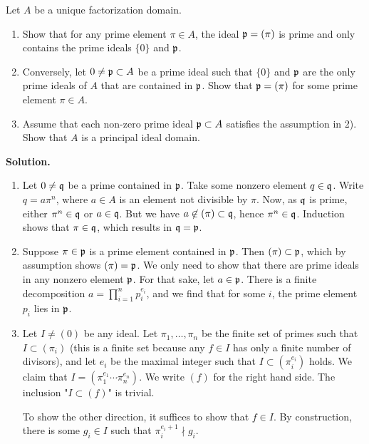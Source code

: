 \documentclass[a4paper,11pt]{article}
\begin{document}
Let $A$ be a unique factorization domain. 
\begin{enumerate}
    \item Show that for any prime element $\pi \in A$, the ideal $\mathfrak{p} = (\pi)$ is 
        prime and only contains the prime ideals $\{0\}$ and $\mathfrak{p}$.
    \item Conversely, let $0 \neq \mathfrak{p} \subset A$ be a prime ideal such that $\{0\}$
        and $\mathfrak{p}$ are the only prime ideals of $A$ that are contained in $\mathfrak{p}$. 
        Show that $\mathfrak{p} = (\pi)$ for some prime element $\pi \in A$. 
    \item Assume that each non-zero prime ideal $\mathfrak{p} \subset A$ satisfies the
        assumption in 2). Show that $A$ is a principal ideal domain. 
\end{enumerate}

\textbf{Solution.}
\begin{enumerate}
    \item Let $0 \neq \mathfrak{q}$ be a prime contained in $\mathfrak{p}$. Take some nonzero
        element $q \in \mathfrak{q}$. Write $q = a \pi^n$, where $a \in A$ is an element
        not divisible by $\pi$. Now, as $\mathfrak{q}$ is prime, either $\pi^n \in \mathfrak{q}$ or 
        $a \in \mathfrak{q}$. But we have $a \not \in (\pi) \subset \mathfrak{q}$, hence
        $\pi^n \in \mathfrak{q}$. Induction shows that $\pi \in \mathfrak{q}$, which results in
        $\mathfrak{q} = \mathfrak{p}$. 

    \item Suppose $\pi \in \mathfrak{p}$ is a prime element contained in $\mathfrak{p}$. Then
        $(\pi) \subset \mathfrak{p}$, which by assumption shows $(\pi) = \mathfrak{p}$. 
        We only need to show that there are prime ideals in any
        nonzero element $\mathfrak{p}$. For that sake, let $a \in \mathfrak{p}$. There is a finite
        decomposition $a = \prod_{i=1}^n p_i^{e_i}$, and we find 
        that for some $i$, the prime element $p_i$ lies in $\mathfrak{p}$. 

    \item Let $I \neq (0)$ be any ideal. Let $\pi_1, \dots, \pi_n$ be the
        finite set of primes such that $I \subset (\pi_i)$ (this is a finite set
        because any $f \in I$ has only a finite number of divisors), and let
        $e_i$ be the maximal integer such that $I \subset (\pi_i^{e_i})$ holds.
        We claim that $I = (\pi_1^{e_1} \cdots \pi_n^{e_n})$. We write $(f)$
        for the right hand side. The inclusion "$I \subset (f)$" is trivial. 

        To show the other direction, it suffices to show that $f \in I$. By 
        construction, there is some $g_i \in I$ such that $\pi_i^{e_i + 1}
        \nmid g_i$. 


\end{enumerate}
\end{document}

